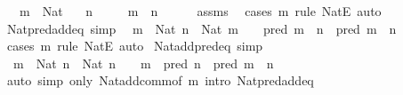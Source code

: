 \begin{isabellebody}
\ \ \ {\isachardoublequoteopen}m\ {\isacharcolon}{\kern0pt}\ Nat{\isachardoublequoteclose}\isanewline
\ \ \ {\isachardoublequoteopen}n\ {\isasymnoteq}\ {}{\isachardoublequoteclose}\isanewline
\ \ \ {\isachardoublequoteopen}m\ {\isacharplus}{\kern0pt}\ n\ {\isasymnoteq}\ {}{\isachardoublequoteclose}\isanewline
%
\isadelimproof
\ \ %
\endisadelimproof
%
\isatagproof
{}\isamarkupfalse%
\ assms\ \isamarkupfalse%
\ {\isacharparenleft}{\kern0pt}cases\ m\ rule{\isacharcolon}{\kern0pt}\ NatE{\isacharparenright}{\kern0pt}\ auto%
\endisatagproof
{\isafoldproof}%
%
\isadelimproof
\isanewline
%
\endisadelimproof
\isanewline
{}\isamarkupfalse%
\ Nat{\isacharunderscore}{\kern0pt}pred{\isacharunderscore}{\kern0pt}add{\isacharunderscore}{\kern0pt}eq\ {\isacharbrackleft}{\kern0pt}simp{\isacharbrackright}{\kern0pt}{\isacharcolon}{\kern0pt}\isanewline
\ \ {\isachardoublequoteopen}{\isasymlbrakk}m\ {\isacharcolon}{\kern0pt}\ Nat{\isacharsemicolon}{\kern0pt}\ n\ {\isacharcolon}{\kern0pt}\ Nat{\isacharsemicolon}{\kern0pt}\ m\ {\isasymnoteq}\ {}{\isasymrbrakk}\ {\isasymLongrightarrow}\ pred\ m\ {\isacharplus}{\kern0pt}\ n\ {\isacharequal}{\kern0pt}\ pred\ {\isacharparenleft}{\kern0pt}m\ {\isacharplus}{\kern0pt}\ n{\isacharparenright}{\kern0pt}{\isachardoublequoteclose}\isanewline
%
\isadelimproof
\ \ %
\endisadelimproof
%
\isatagproof
{}\isamarkupfalse%
\ {\isacharparenleft}{\kern0pt}cases\ m\ rule{\isacharcolon}{\kern0pt}\ NatE{\isacharparenright}{\kern0pt}\ auto%
\endisatagproof
{\isafoldproof}%
%
\isadelimproof
\isanewline
%
\endisadelimproof
\isanewline
{}\isamarkupfalse%
\ Nat{\isacharunderscore}{\kern0pt}add{\isacharunderscore}{\kern0pt}pred{\isacharunderscore}{\kern0pt}eq\ {\isacharbrackleft}{\kern0pt}simp{\isacharbrackright}{\kern0pt}{\isacharcolon}{\kern0pt}\isanewline
\ \ {\isachardoublequoteopen}{\isasymlbrakk}m\ {\isacharcolon}{\kern0pt}\ Nat{\isacharsemicolon}{\kern0pt}\ n\ {\isacharcolon}{\kern0pt}\ Nat{\isacharsemicolon}{\kern0pt}\ n\ {\isasymnoteq}\ {}{\isasymrbrakk}\ {\isasymLongrightarrow}\ m\ {\isacharplus}{\kern0pt}\ pred\ n\ {\isacharequal}{\kern0pt}\ pred\ {\isacharparenleft}{\kern0pt}m\ {\isacharplus}{\kern0pt}\ n{\isacharparenright}{\kern0pt}{\isachardoublequoteclose}\isanewline
%
\isadelimproof
\ \ %
\endisadelimproof
%
\isatagproof
{}\isamarkupfalse%
\ {\isacharparenleft}{\kern0pt}auto\ simp\ only{\isacharcolon}{\kern0pt}\ Nat{\isacharunderscore}{\kern0pt}add{\isacharunderscore}{\kern0pt}comm{\isacharbrackleft}{\kern0pt}of\ m{\isacharbrackright}{\kern0pt}\ intro{\isacharcolon}{\kern0pt}\ Nat{\isacharunderscore}{\kern0pt}pred{\isacharunderscore}{\kern0pt}add{\isacharunderscore}{\kern0pt}eq{\isacharparenright}{\kern0pt}%

\end{isabellebody}
